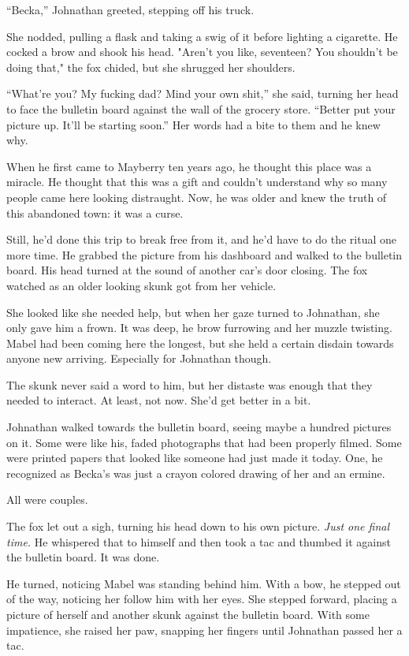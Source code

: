 ``Becka,'' Johnathan greeted, stepping off his truck.

She nodded, pulling a flask and taking a swig of it before lighting a
cigarette. He cocked a brow and shook his head. "Aren't you like,
seventeen? You shouldn't be doing that," the fox chided, but she
shrugged her shoulders.

``What're you? My fucking dad? Mind your own shit,'' she said, turning her
head to face the bulletin board against the wall of the grocery store.
``Better put your picture up. It'll be starting soon.'' Her words had a
bite to them and he knew why.

When he first came to Mayberry ten years ago, he thought this place was
a miracle. He thought that this was a gift and couldn't understand why
so many people came here looking distraught. Now, he was older and knew
the truth of this abandoned town: it was a curse.

Still, he'd done this trip to break free from it, and he'd have to do
the ritual one more time. He grabbed the picture from his dashboard and
walked to the bulletin board. His head turned at the sound of another
car's door closing. The fox watched as an older looking skunk got from
her vehicle.

She looked like she needed help, but when her gaze turned to Johnathan,
she only gave him a frown. It was deep, he brow furrowing and her muzzle
twisting. Mabel had been coming here the longest, but she held a certain
disdain towards anyone new arriving. Especially for Johnathan though.

The skunk never said a word to him, but her distaste was enough that
they needed to interact. At least, not now. She'd get better in a bit.

Johnathan walked towards the bulletin board, seeing maybe a hundred
pictures on it. Some were like his, faded photographs that had been
properly filmed. Some were printed papers that looked like someone had
just made it today. One, he recognized as Becka's was just a crayon
colored drawing of her and an ermine.

All were couples.

The fox let out a sigh, turning his head down to his own picture.
\emph{Just one final time.} He whispered that to himself and then took a
tac and thumbed it against the bulletin board. It was done.

He turned, noticing Mabel was standing behind him. With a bow, he
stepped out of the way, noticing her follow him with her eyes. She
stepped forward, placing a picture of herself and another skunk against
the bulletin board. With some impatience, she raised her paw, snapping
her fingers until Johnathan passed her a tac.

